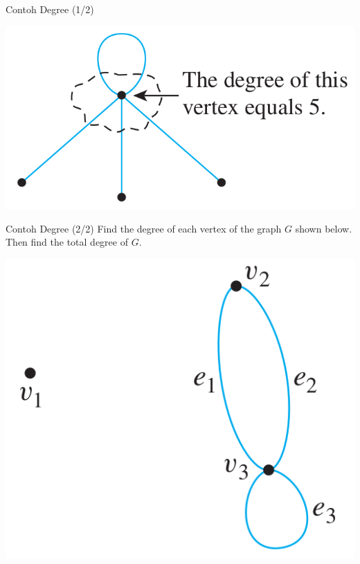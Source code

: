 \documentclass[english,t]{beamer}
\begin{document}
\begin{frame}{Contoh Degree (1/2)}
	\begin{center}
		\includegraphics[scale=.3]{images/contoh-degree}
	\end{center}
\end{frame}

\begin{frame}{Contoh Degree (2/2)}
	Find the degree of each vertex of the graph $G$ shown below. Then find the total degree of $G$.
	\begin{center}
		\includegraphics[scale=.25]{images/contoh-degree-2}
	\end{center}
\end{frame}
\end{document}
